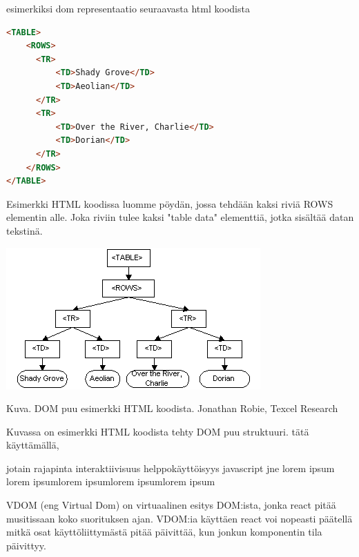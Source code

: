 esimerkiksi dom representaatio seuraavasta html koodista

    
\begin{tcolorbox}
\begin{lstlisting}[language=html]
<TABLE>
    <ROWS> 
      <TR> 
          <TD>Shady Grove</TD>
          <TD>Aeolian</TD> 
      </TR> 
      <TR>
          <TD>Over the River, Charlie</TD>
          <TD>Dorian</TD> 
      </TR> 
    </ROWS>
</TABLE>
\end{lstlisting}
\end{tcolorbox}


Esimerkki HTML koodissa luomme pöydän, jossa tehdään kaksi riviä ROWS elementin alle. 
Joka riviin tulee kaksi "table data"{} elementtiä, jotka sisältää datan tekstinä.
\bigskip



\includegraphics{./src/public/oppar/dom.png}

Kuva\getImgCount .{} DOM puu esimerkki HTML koodista. Jonathan Robie, Texcel Research 
\medskip

Kuvassa on esimerkki HTML koodista tehty DOM puu struktuuri.
tätä käyttämällä, 

jotain rajapinta interaktiivisuus helppokäyttöisyys javascript jne lorem ipsum lorem ipsumlorem ipsumlorem ipsumlorem ipsum

\bigskip




VDOM (eng Virtual Dom) on virtuaalinen esitys DOM:ista, jonka react pitää musitissaan koko suorituksen ajan.
VDOM:ia käyttäen react voi nopeasti päätellä mitkä osat käyttöliittymästä pitää päivittää, kun jonkun komponentin tila päivittyy. 
\medskip



